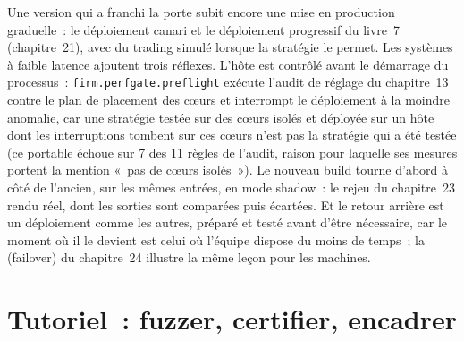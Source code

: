 Une version qui a franchi la porte subit encore une mise en production graduelle~: le déploiement canari et le déploiement progressif du
livre~7 (chapitre~21), avec du trading simulé lorsque la stratégie le permet. Les systèmes à faible latence ajoutent trois réflexes. L'hôte est contrôlé
avant le démarrage du processus~: \texttt{firm.perfgate.preflight} exécute l'audit de réglage du chapitre~13 contre le plan de placement des cœurs
et interrompt le déploiement à la moindre anomalie, car une stratégie testée sur des cœurs isolés et déployée sur un hôte dont les interruptions tombent sur
ces cœurs n'est pas la stratégie qui a été testée (ce portable échoue sur 7 des 11 règles de l'audit, raison pour laquelle ses mesures portent
la mention «~pas de cœurs isolés~»). Le nouveau build tourne d'abord à côté de l'ancien, sur les mêmes entrées, en mode shadow~: le rejeu
du chapitre~23 rendu réel, dont les sorties sont comparées puis écartées. Et le retour arrière est un déploiement comme les autres, préparé et
testé avant d'être nécessaire, car le moment où il le devient est celui où l'équipe dispose du moins de temps~; la  (failover)
du chapitre~24 illustre la même leçon pour les machines.

\section{Tutoriel~: fuzzer, certifier, encadrer}\label{tut:ll:testing-and-deploying-low-latency-systems:tut}

